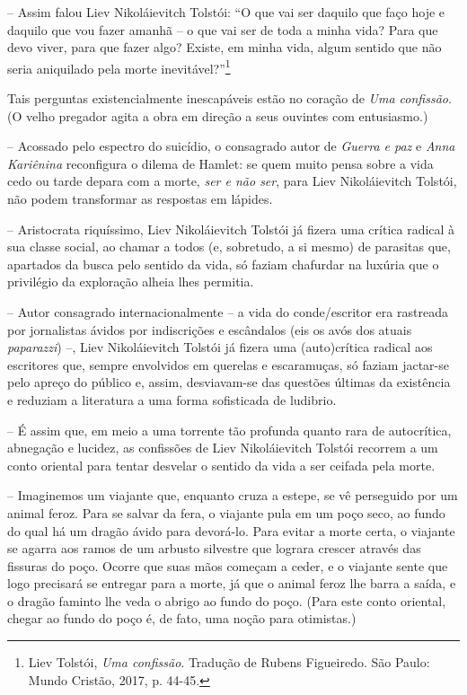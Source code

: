 -- Assim falou Liev Nikoláievitch Tolstói: ``O que vai ser daquilo que
faço hoje e daquilo que vou fazer amanhã -- o que vai ser de toda a
minha vida? Para que devo viver, para que fazer algo? Existe, em minha
vida, algum sentido que não seria aniquilado pela morte
inevitável?''\footnote{Liev Tolstói, \emph{Uma confissão}. Tradução de
  Rubens Figueiredo. São Paulo: Mundo Cristão, 2017, p. 44-45.}

Tais perguntas existencialmente inescapáveis estão no coração de
\emph{Uma confissão}. (O velho pregador agita a obra em direção a seus
ouvintes com entusiasmo.)

-- Acossado pelo espectro do suicídio, o consagrado autor de
\emph{Guerra e paz} e \emph{Anna Kariênina} reconfigura o dilema de
Hamlet: se quem muito pensa sobre a vida cedo ou tarde depara com a
morte, \emph{ser e não ser}, para Liev Nikoláievitch Tolstói, não podem
transformar as respostas em lápides.

-- Aristocrata riquíssimo, Liev Nikoláievitch Tolstói já fizera uma
crítica radical à sua classe social, ao chamar a todos (e, sobretudo, a
si mesmo) de parasitas que, apartados da busca pelo sentido da vida, só
faziam chafurdar na luxúria que o privilégio da exploração alheia lhes
permitia.

-- Autor consagrado internacionalmente -- a vida do conde/escritor era
rastreada por jornalistas ávidos por indiscrições e escândalos (eis os
avós dos atuais \emph{paparazzi}) --, Liev Nikoláievitch Tolstói já
fizera uma (auto)crítica radical aos escritores que, sempre envolvidos
em querelas e escaramuças, só faziam jactar-se pelo apreço do público e,
assim, desviavam-se das questões últimas da existência e reduziam a
literatura a uma forma sofisticada de ludibrio.

-- É assim que, em meio a uma torrente tão profunda quanto rara de
autocrítica, abnegação e lucidez, as confissões de Liev Nikoláievitch
Tolstói recorrem a um conto oriental para tentar desvelar o sentido da
vida a ser ceifada pela morte.

-- Imaginemos um viajante que, enquanto cruza a estepe, se vê perseguido
por um animal feroz. Para se salvar da fera, o viajante pula em um poço
seco, ao fundo do qual há um dragão ávido para devorá-lo. Para evitar a
morte certa, o viajante se agarra aos ramos de um arbusto silvestre que
lograra crescer através das fissuras do poço. Ocorre que suas mãos
começam a ceder, e o viajante sente que logo precisará se entregar para
a morte, já que o animal feroz lhe barra a saída, e o dragão faminto lhe
veda o abrigo ao fundo do poço. (Para este conto oriental, chegar ao
fundo do poço é, de fato, uma noção para otimistas.)

